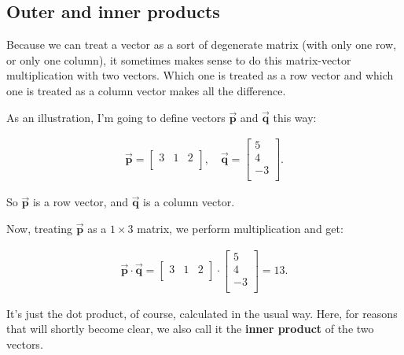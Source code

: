 
\subsection{Outer and inner products}

Because we can treat a vector as a sort of degenerate matrix (with only one
row, or only one column), it sometimes makes sense to do this matrix-vector
multiplication with two vectors. Which one is treated as a row vector and which
one is treated as a column vector makes all the difference.

As an illustration, I'm going to define vectors $\overrightarrow{\textbf{p}}$
and $\overrightarrow{\textbf{q}}$ this way:

\vspace{-.15in}
\begin{align*}
\overrightarrow{\textbf{p}} =
\begin{bmatrix}
3 & 1 & 2 \\
\end{bmatrix}, \quad 
\overrightarrow{\textbf{q}} =
\begin{bmatrix}
5 \\  4 \\ -3 \\
\end{bmatrix}.
\end{align*}
\vspace{-.15in}

So $\overrightarrow{\textbf{p}}$ is a row vector, and
$\overrightarrow{\textbf{q}}$ is a column vector.

Now, treating $\overrightarrow{\textbf{p}}$ as a $1\times 3$ matrix, we perform
multiplication and get:

\vspace{-.15in}
\begin{align*}
\overrightarrow{\textbf{p}} \cdot \overrightarrow{\textbf{q}} =
\begin{bmatrix}
3 & 1 & 2 \\
\end{bmatrix} \cdot
\begin{bmatrix}
5 \\ 4 \\ -3 \\
\end{bmatrix} = 13.
\end{align*}
\vspace{-.15in}

It's just the dot product, of course, calculated in the usual way. Here, for
reasons that will shortly become clear, we also call it the \textbf{inner
product} of the two vectors.

